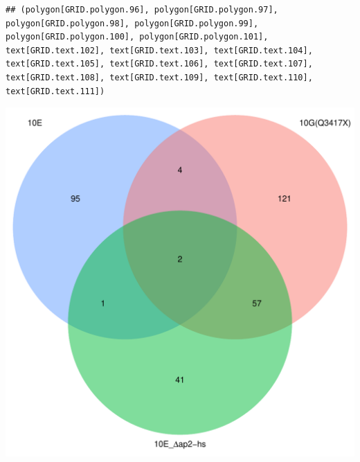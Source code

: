 \documentclass{article}\usepackage[]{graphicx}\usepackage[]{color}
\makeatletter
\newenvironment{kframe}{%
 \def\at@end@of@kframe{}%
 \ifinner\ifhmode%
  \def\at@end@of@kframe{\end{minipage}}%
  \begin{minipage}{\columnwidth}%
 \fi\fi%
 \def\FrameCommand##1{\hskip\@totalleftmargin \hskip-\fboxsep
 \colorbox{shadecolor}{##1}\hskip-\fboxsep
     \hskip-\linewidth \hskip-\@totalleftmargin \hskip\columnwidth}%
 \MakeFramed {\advance\hsize-\width
   \@totalleftmargin\z@ \linewidth\hsize
   \@setminipage}}%
 {\par\unskip\endMakeFramed%
 \at@end@of@kframe}
\newenvironment{knitrout}{}{} %
\makeatother
\begin{document}
\begin{knitrout}
\color{fgcolor}\begin{kframe}
\begin{verbatim}
## (polygon[GRID.polygon.96], polygon[GRID.polygon.97], polygon[GRID.polygon.98], polygon[GRID.polygon.99], polygon[GRID.polygon.100], polygon[GRID.polygon.101], text[GRID.text.102], text[GRID.text.103], text[GRID.text.104], text[GRID.text.105], text[GRID.text.106], text[GRID.text.107], text[GRID.text.108], text[GRID.text.109], text[GRID.text.110], text[GRID.text.111])
\end{verbatim}
\end{kframe}

{\centering \includegraphics[width=1\linewidth,height=.4\textheight]{figure/minimal-venn_t3_3fc_up_venn-1} 

}



\end{knitrout}
\end{document}
